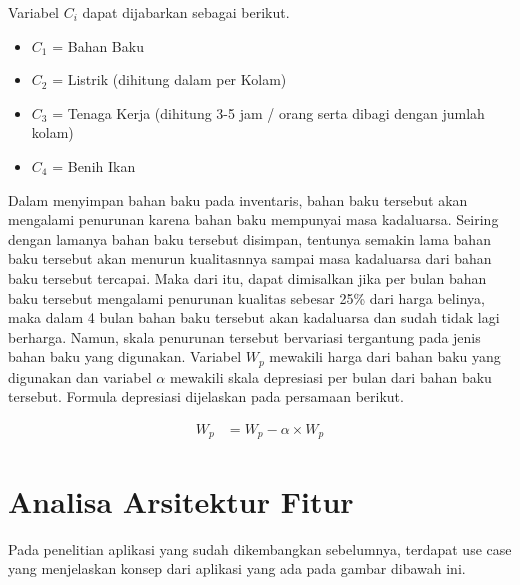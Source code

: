 Variabel $C_i$ dapat dijabarkan sebagai berikut.

\begin{itemize}
	\item $C_1$ = Bahan Baku
	\item $C_2$ = Listrik (dihitung dalam per Kolam)
	\item $C_3$ = Tenaga Kerja (dihitung 3-5 jam / orang serta dibagi dengan jumlah kolam)
	\item $C_4$ = Benih Ikan
\end{itemize}

Dalam menyimpan bahan baku pada inventaris, bahan baku tersebut akan mengalami penurunan karena bahan baku mempunyai masa kadaluarsa. Seiring dengan lamanya bahan baku tersebut disimpan, tentunya semakin lama bahan baku tersebut akan menurun kualitasnnya sampai masa kadaluarsa dari bahan baku tersebut tercapai. Maka dari itu, dapat dimisalkan jika per bulan bahan baku tersebut mengalami penurunan kualitas sebesar 25\% dari harga belinya, maka dalam 4 bulan bahan baku tersebut akan kadaluarsa dan sudah tidak lagi berharga. Namun, skala penurunan tersebut bervariasi tergantung pada jenis bahan baku yang digunakan. Variabel $W_p$ mewakili harga dari bahan baku yang digunakan dan variabel $\alpha$ mewakili skala depresiasi per bulan dari bahan baku tersebut. Formula depresiasi dijelaskan pada persamaan berikut.  

\begin{equation}
    \begin{split}
		W_p
		&= W_p - \alpha \times W_p
    \end{split}
\end{equation}



\section{Analisa Arsitektur Fitur}

Pada penelitian aplikasi yang sudah dikembangkan sebelumnya, terdapat use case yang menjelaskan konsep dari aplikasi yang ada pada gambar dibawah ini.

